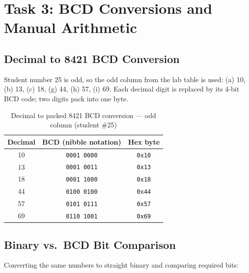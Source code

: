 \documentclass[12pt,a4paper]{article}
\begin{document}
\newpage

\section{Task 3: BCD Conversions and Manual Arithmetic}

\subsection{Decimal to 8421 BCD Conversion}

Student number 25 is odd, so the odd column from the lab table is used:
(a) 10, (b) 13, (c) 18, (g) 44, (h) 57, (i) 69.
Each decimal digit is replaced by its 4-bit BCD code; two digits pack into one byte.

\begin{table}[H]
  \centering
  \caption{Decimal to packed 8421 BCD conversion --- odd column (student \#25)}
  \renewcommand{\arraystretch}{1.3}
  \begin{tabular}{|c|c|c|}
    \hline
    \textbf{Decimal} & \textbf{BCD (nibble notation)} & \textbf{Hex byte} \\
    \hline
    10 & \texttt{0001\ 0000} & \texttt{0x10} \\
    13 & \texttt{0001\ 0011} & \texttt{0x13} \\
    18 & \texttt{0001\ 1000} & \texttt{0x18} \\
    44 & \texttt{0100\ 0100} & \texttt{0x44} \\
    57 & \texttt{0101\ 0111} & \texttt{0x57} \\
    69 & \texttt{0110\ 1001} & \texttt{0x69} \\
    \hline
  \end{tabular}
\end{table}

\subsection{Binary vs.\ BCD Bit Comparison}

Converting the same numbers to straight binary and comparing required bits:
\end{document}
